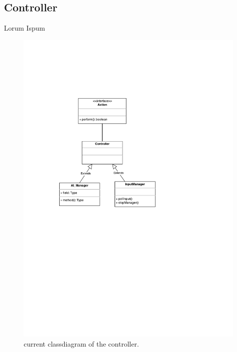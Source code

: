 \subsection{Controller}
Lorum Ispum

\begin{figure}[htbp]
	\centering
	\includegraphics[width=\textwidth]{controller-classdiagram.pdf}
	\caption{current classdiagram of the controller.}
\end{figure}

\FloatBarrier